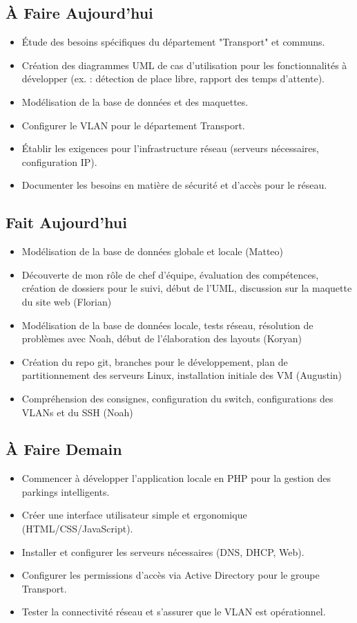 \documentclass[a4paper,12pt]{report}
\begin{document}
\subsection{À Faire Aujourd'hui}
\begin{itemize}
    \item Étude des besoins spécifiques du département "Transport" et communs.
    \item Création des diagrammes UML de cas d'utilisation pour les fonctionnalités à développer (ex. : détection de place libre, rapport des temps d'attente).
    \item Modélisation de la base de données et des maquettes.
    \item Configurer le VLAN pour le département Transport.
    \item Établir les exigences pour l'infrastructure réseau (serveurs nécessaires, configuration IP).
    \item Documenter les besoins en matière de sécurité et d'accès pour le réseau.
\end{itemize}

\subsection{Fait Aujourd'hui}
\begin{itemize}
    \item Modélisation de la base de données globale et locale (Matteo)
    \item Découverte de mon rôle de chef d’équipe, évaluation des compétences, création de dossiers pour le suivi, début de l’UML, discussion sur la maquette du site web (Florian)
    \item Modélisation de la base de données locale, tests réseau, résolution de problèmes avec Noah, début de l’élaboration des layouts (Koryan)
    \item Création du repo git, branches pour le développement, plan de partitionnement des serveurs Linux, installation initiale des VM (Augustin)
    \item Compréhension des consignes, configuration du switch, configurations des VLANs et du SSH (Noah)
\end{itemize}

\subsection{À Faire Demain}
\begin{itemize}
    \item Commencer à développer l'application locale en PHP pour la gestion des parkings intelligents.
    \item Créer une interface utilisateur simple et ergonomique (HTML/CSS/JavaScript).
    \item Installer et configurer les serveurs nécessaires (DNS, DHCP, Web).
    \item Configurer les permissions d'accès via Active Directory pour le groupe Transport.
    \item Tester la connectivité réseau et s'assurer que le VLAN est opérationnel.
\end{itemize}
\end{document}
